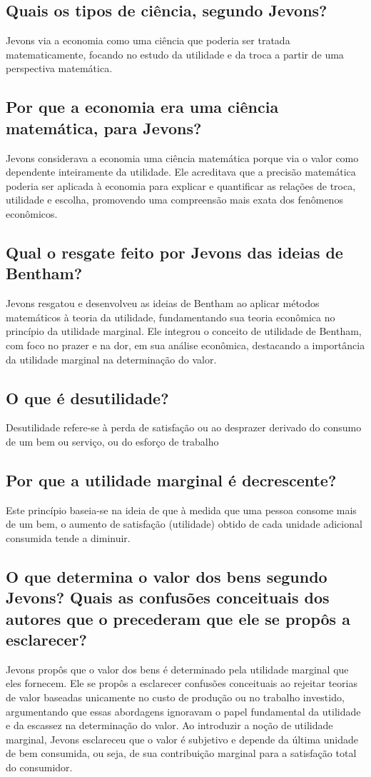\documentclass[a4paper,12pt]{article}[abntex2]
\begin{document}
\subsection{\textbf{Quais os tipos de ciência, segundo Jevons?}}
 Jevons via a economia como uma ciência que poderia ser tratada matematicamente, focando no estudo da utilidade e da troca a partir de uma perspectiva matemática.
\subsection{\textbf{Por que a economia era uma ciência matemática, para Jevons?}}
Jevons considerava a economia uma ciência matemática porque via o valor como dependente inteiramente da utilidade. Ele acreditava que a precisão matemática poderia ser aplicada à economia para explicar e quantificar as relações de troca, utilidade e escolha, promovendo uma compreensão mais exata dos fenômenos econômicos.
\subsection{\textbf{Qual o resgate feito por Jevons das ideias de Bentham?}}
Jevons resgatou e desenvolveu as ideias de Bentham ao aplicar métodos matemáticos à teoria da utilidade, fundamentando sua teoria econômica no princípio da utilidade marginal. Ele integrou o conceito de utilidade de Bentham, com foco no prazer e na dor, em sua análise econômica, destacando a importância da utilidade marginal na determinação do valor.
\subsection{\textbf{O que é desutilidade?}}
Desutilidade refere-se à perda de satisfação ou ao desprazer derivado do consumo de um bem ou serviço, ou do esforço de trabalho
\subsection{\textbf{Por que a utilidade marginal é decrescente?}}
 Este princípio baseia-se na ideia de que à medida que uma pessoa consome mais de um bem, o aumento de satisfação (utilidade) obtido de cada unidade adicional consumida tende a diminuir.
\subsection{\textbf{O que determina o valor dos bens segundo Jevons? Quais as confusões conceituais dos autores que o precederam que ele se propôs a esclarecer?}}
Jevons propôs que o valor dos bens é determinado pela utilidade marginal que eles fornecem. Ele se propôs a esclarecer confusões conceituais ao rejeitar teorias de valor baseadas unicamente no custo de produção ou no trabalho investido, argumentando que essas abordagens ignoravam o papel fundamental da utilidade e da escassez na determinação do valor. Ao introduzir a noção de utilidade marginal, Jevons esclareceu que o valor é subjetivo e depende da última unidade de bem consumida, ou seja, de sua contribuição marginal para a satisfação total do consumidor.
\end{document}
